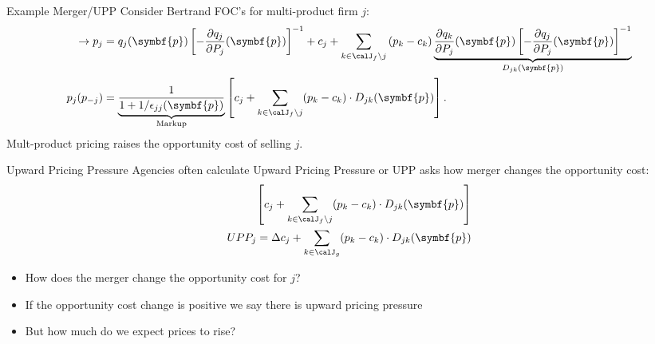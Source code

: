 \begin{frame}{Example Merger/UPP}
\footnotesize
Consider Bertrand FOC's for multi-product firm $j$:
\begin{align*}
\label{eq:best_response}
\rightarrow \nonumber p_j &=q_{j}(\symbf{p}) \left[-\frac{\partial q_{j}}{\partial P_{j}}(\symbf{p})\right]^{-1} + c_{j} + \sum_{k \in \calJ_{f} \setminus j} \left(p_{k}-c_{k}\right) \underbrace{\frac{\partial q_{k}}{\partial P_{j}}(\symbf{p})\left[-\frac{\partial q_{j}}{\partial P_{j}}(\symbf{p})\right]^{-1}}_{D_{jk}(\symbf{p})}\\
p_j(p_{-j}) &= \underbrace{\frac{1}{1+1/\epsilon_{jj}(\symbf{p})}}_{\text{Markup}} \left[ c_j + \sum_{k \in \calJ_{f} \setminus j}  (p_k-c_k) \cdot  D_{jk} (\symbf{p}) \right].
\end{align*}
Mult-product pricing \alert{raises the opportunity cost} of selling $j$.
\end{frame}

\begin{frame}{Upward Pricing Pressure}
Agencies often calculate \alert{Upward Pricing Pressure} or UPP asks how merger \alert{changes} the opportunity cost:
\begin{align*}
\left[ c_j + \sum_{k \in \calJ_{f} \setminus j}  (p_k-c_k) \cdot  D_{jk} (\symbf{p}) \right] \\
UPP_j = \Delta c_j + \sum_{k \in \calJ_{g}}  (p_k-c_k) \cdot  D_{jk} (\symbf{p}) 
\end{align*}
\begin{itemize}
    \item How does the merger change the \alert{opportunity cost} for $j$?
    \item If the opportunity cost change is positive we say there is \alert{upward pricing pressure}
    \item But how much do we expect prices to rise?
\end{itemize}
\end{frame}


